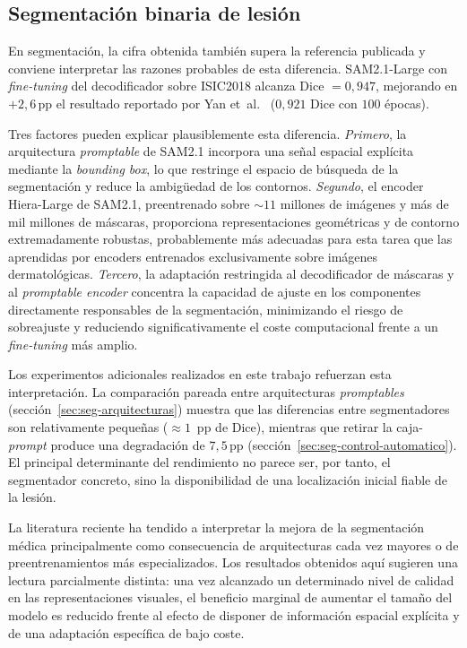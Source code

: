 \subsection{Segmentación binaria de lesión}
\label{sec:lit-seg}

En segmentación, la cifra obtenida también supera la referencia
publicada y conviene interpretar las razones probables de esta
diferencia. SAM2.1-Large con \emph{fine-tuning} del decodificador sobre
ISIC2018 alcanza Dice $= 0{,}947$, mejorando en $+2{,}6$\,pp el
resultado reportado por Yan et~al.~\cite{panderm2025} ($0{,}921$ Dice
con $100$ épocas).

Tres factores pueden explicar plausiblemente esta diferencia.
\textit{Primero}, la arquitectura \emph{promptable} de SAM2.1 incorpora
una señal espacial explícita mediante la \emph{bounding box}, lo que
restringe el espacio de búsqueda de la segmentación y reduce la
ambigüedad de los contornos. \textit{Segundo}, el encoder Hiera-Large de
SAM2.1, preentrenado sobre $\sim 11$ millones de imágenes y más de mil
millones de máscaras, proporciona representaciones geométricas y de
contorno extremadamente robustas, probablemente más adecuadas para esta
tarea que las aprendidas por encoders entrenados exclusivamente sobre
imágenes dermatológicas. \textit{Tercero}, la adaptación restringida al
decodificador de máscaras y al \emph{promptable encoder} concentra la
capacidad de ajuste en los componentes directamente responsables de la
segmentación, minimizando el riesgo de sobreajuste y reduciendo
significativamente el coste computacional frente a un \emph{fine-tuning}
más amplio.

Los experimentos adicionales realizados en este trabajo refuerzan esta
interpretación. La comparación pareada entre arquitecturas
\emph{promptables} (sección~\ref{sec:seg-arquitecturas}) muestra que las
diferencias entre segmentadores son relativamente pequeñas ($\approx 1$
\,pp de Dice), mientras que retirar la caja-\emph{prompt} produce una
degradación de $7{,}5$\,pp (sección~\ref{sec:seg-control-automatico}).
El principal determinante del rendimiento no parece ser, por tanto, el
segmentador concreto, sino la disponibilidad de una localización inicial
fiable de la lesión.

La literatura reciente ha tendido a interpretar la mejora de la
segmentación médica principalmente como consecuencia de arquitecturas
cada vez mayores o de preentrenamientos más especializados. Los
resultados obtenidos aquí sugieren una lectura parcialmente distinta:
una vez alcanzado un determinado nivel de calidad en las
representaciones visuales, el beneficio marginal de aumentar el tamaño
del modelo es reducido frente al efecto de disponer de información
espacial explícita y de una adaptación específica de bajo coste.

